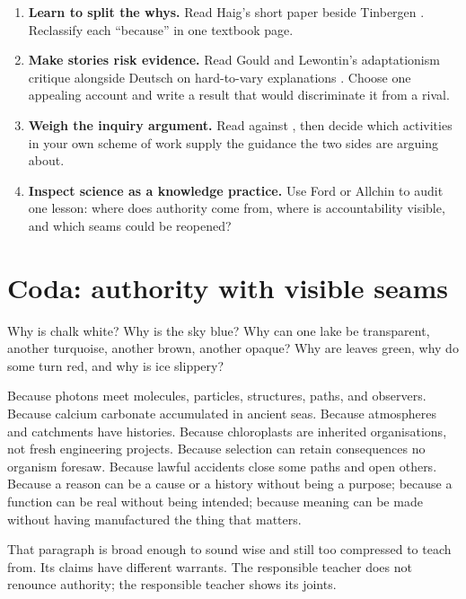 \begin{enumerate}[leftmargin=1.7em,label=\textbf{\arabic*.}]
  \item \textbf{Learn to split the whys.} Read Haig's short paper \citep{haig2013} beside Tinbergen \citep{tinbergen1963}. Reclassify each ``because'' in one textbook page.

  \item \textbf{Make stories risk evidence.} Read Gould and Lewontin's adaptationism critique \citep{gouldlewontin1979} alongside Deutsch on hard-to-vary explanations \citep{deutsch2011}. Choose one appealing account and write a result that would discriminate it from a rival.

  \item \textbf{Weigh the inquiry argument.} Read \citet{kirschner2006} against \citet{hmelosilver2007}, then decide which activities in your own scheme of work supply the guidance the two sides are arguing about.

  \item \textbf{Inspect science as a knowledge practice.} Use Ford \citep{ford2008} or Allchin \citep{allchin2011} to audit one lesson: where does authority come from, where is accountability visible, and which seams could be reopened?
\end{enumerate}

\section{Coda: authority with visible seams}

Why is chalk white? Why is the sky blue? Why can one lake be transparent, another turquoise, another brown, another opaque? Why are leaves green, why do some turn red, and why is ice slippery?

Because photons meet molecules, particles, structures, paths, and observers. Because calcium carbonate accumulated in ancient seas. Because atmospheres and catchments have histories. Because chloroplasts are inherited organisations, not fresh engineering projects. Because selection can retain consequences no organism foresaw. Because lawful accidents close some paths and open others. Because a reason can be a cause or a history without being a purpose; because a function can be real without being intended; because meaning can be made without having manufactured the thing that matters.

That paragraph is broad enough to sound wise and still too compressed to teach from. Its claims have different warrants. The responsible teacher does not renounce authority; the responsible teacher shows its joints.


